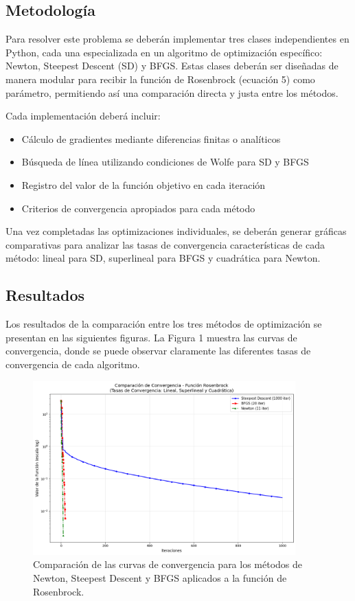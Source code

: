 \documentclass{article}
\begin{document}
\subsection{Metodología}

Para resolver este problema se deberán implementar tres clases independientes en Python, cada una especializada en un algoritmo de optimización específico: Newton, Steepest Descent (SD) y BFGS. Estas clases deberán ser diseñadas de manera modular para recibir la función de Rosenbrock (ecuación 5) como parámetro, permitiendo así una comparación directa y justa entre los métodos.

Cada implementación deberá incluir:
\begin{itemize}
    \item Cálculo de gradientes mediante diferencias finitas o analíticos
    \item Búsqueda de línea utilizando condiciones de Wolfe para SD y BFGS
    \item Registro del valor de la función objetivo en cada iteración
    \item Criterios de convergencia apropiados para cada método
\end{itemize}

Una vez completadas las optimizaciones individuales, se deberán generar gráficas comparativas para analizar las tasas de convergencia características de cada método: lineal para SD, superlineal para BFGS y cuadrática para Newton.

\subsection{Resultados}
\setcounter{equation}{0}

Los resultados de la comparación entre los tres métodos de optimización se presentan en las siguientes figuras. La Figura 1 muestra las curvas de convergencia, donde se puede observar claramente las diferentes tasas de convergencia de cada algoritmo.

\begin{figure}[H]
    \centering
    \includegraphics[width=0.9\textwidth]{images/6_convergencia.png}
    \caption{Comparación de las curvas de convergencia para los métodos de Newton, Steepest Descent y BFGS aplicados a la función de Rosenbrock.}
\end{figure}
\end{document}
